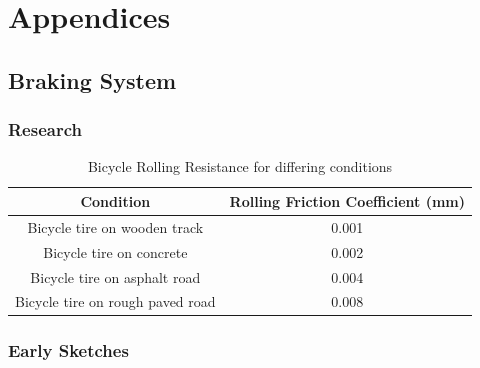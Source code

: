\documentclass[a4paper]{report}
\begin{document}
\part*{Appendices}

\appendix
\chapter{Braking System}
\section{Research}

\begin{table}[h]

    \begin{tabular}{ | c | c |}
    \hline
    \textbf{Condition} & \textbf{Rolling Friction Coefficient (mm)} \\ \hline
   
   Bicycle tire on wooden track & 0.001   \\ \hline
   Bicycle tire on concrete & 0.002 \\ \hline
  Bicycle tire on asphalt road & 0.004 \\ \hline
  Bicycle tire on rough paved road & 0.008 \\ \hline

  \end{tabular}

\caption[Table caption text]{Bicycle Rolling Resistance for differing conditions \cite{cite:bicycle_friction}} 
\label{table:bicycle_friction}
\end{table}

\section{Early Sketches}
\label{app:early_sketches}
\end{document}
